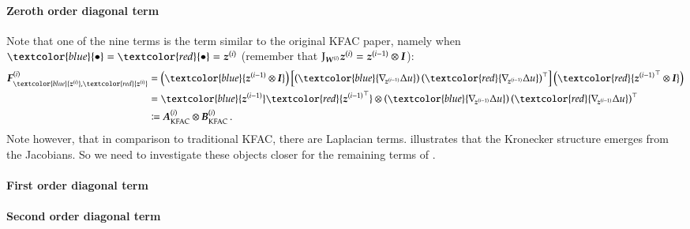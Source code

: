 \paragraph{Zeroth order diagonal term}
Note that one of the nine terms is the term similar to the original KFAC paper, namely
when $\textcolor{blue}{\bullet} = \textcolor{red}{\bullet} = \vz^{(i)}$
(remember that $\mathrm{J}_{{\boldsymbol{W}}^{(i)}} {\boldsymbol{z}}^{(i)} = {\boldsymbol{z}}^{(i-1)} \otimes {\boldsymbol{I}}$):
\begin{align}\label{eq:original-kfac}
  \begin{split}
    \mF^{(i)}_{\textcolor{blue}{\vz^{(i)}}, \textcolor{red}{\vz^{(i)}}}
    &=
      \left(
      \textcolor{blue}{\vz^{(i-1)} \otimes \mI}
      \right)
      \left[
      \left(
      \textcolor{blue}{\grad{\vz^{(i-1)}}\Delta u}
      \right)
      \left(
      \textcolor{red}{\grad{\vz^{(i-1)}}\Delta u}
      \right)^{\top}
      \right]
      \left(
      \textcolor{red}{{\vz^{(i-1)}}^{\top} \otimes \mI}
      \right)
    \\
    &=
      \textcolor{blue}{\vz^{(i-1)}}
      \textcolor{red}{{\vz^{(i-1)}}^{\top}}
      \otimes
      \left(
      \textcolor{blue}{\grad{\vz^{(i-1)}}\Delta u}
      \right)
      \left(
      \textcolor{red}{\grad{\vz^{(i-1)}}\Delta u}
      \right)^{\top}
    \\
    &\coloneqq \mA_{\text{KFAC}}^{(i)} \otimes \mB_{\text{KFAC}}^{(i)}\,.
  \end{split}
\end{align}
Note however, that in comparison to traditional KFAC, there are Laplacian terms. 
 illustrates that the Kronecker structure emerges from
the Jacobians. So we need to investigate these objects closer for the remaining
terms of .


\paragraph{First order diagonal term}

\paragraph{Second order diagonal term}


